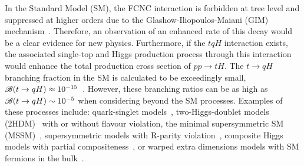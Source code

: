 \documentclass[PAPER, coverpage, atlasdraft=true, texlive=2016, UKenglish]{\ATLASLATEXPATH atlasdoc} %
\begin{document}
In the Standard Model (SM), the FCNC interaction is forbidden at tree level and suppressed at higher orders due to the Glashow-Iliopoulos-Maiani (GIM) mechanism~\cite{Glashow:1970gm}. Therefore, an observation of an enhanced rate of this decay would be a clear evidence for new physics.
Furthermore, if the $tqH$ interaction exists, the associated single-top and  Higgs  production process through this interaction would enhance
the total production cross section of $pp\rightarrow tH$.
The $t\to qH$ branching fraction in the SM is calculated to be exceedingly small, $\mathscr{B}(t\to qH)\approx10^{-15}$~\cite{Eilam:1990zc,Mele:1998ag,AguilarSaavedra:2004wm,Zhang:2013xya}. 
However, these branching ratios can be as high as $\mathscr{B}(t\to qH) \sim 10^{-5}$ when considering beyond the SM processes. Examples of these processes include: quark-singlet models~\cite{AguilarSaavedra:2002kr}, two-Higgs-doublet models (2HDM)~\cite{ Branco:2hdm2012} with or without flavour violation,
the minimal supersymmetric SM (MSSM)~\cite{Bejar:2000ub, Guasch:1999jp,Cao:2007dk,Cao:2014udj},
supersymmetric models with R-parity violation~\cite{Eilam:2001dh}, composite Higgs models with partial  compositeness~\cite{Azatov:2014lha}, 
or warped extra dimensions models with SM fermions in the bulk~\cite{Azatov:2009na}. 
\end{document}
